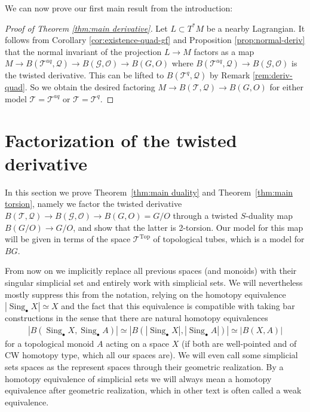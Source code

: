 \documentclass[reqno]{amsart}
\theoremstyle{theorem}
\theoremstyle{remark}
\theoremstyle{definition}
\newcommand{\T}{\mathcal{T}}
\newcommand{\GG}{\mathcal{G}}
\newcommand{\QQ}{\mathcal{Q}}
\newcommand{\OO}{\mathcal{O}}
\DeclareMathOperator{\sing}{Sing}
\newcommand{\TOP}{\mathrm{Top}}
\begin{document}
We can now prove our first main result from the introduction:
\begin{proof}[Proof of Theorem \ref{thm:main derivative}]
Let $L \subset T^*M$ be a nearby Lagrangian. It follows from Corollary \ref{cor:existence-quad-gf} and Proposition \ref{prop:normal-deriv} that the normal invariant of the projection $L \to M$ factors as a map $M \to B(\T^{aq} , \QQ) \to B(\GG, \OO) \to B(G,O)$ where $B(\T^{aq} , \QQ) \to B(\GG, \OO)$ is the twisted derivative. This can be lifted to $B(\T^q,\QQ)$ by Remark \ref{rem:deriv-quad}. So we obtain the desired factoring $M \to B(\T,\QQ) \to B(G,O)$ for either model $\T=\T^{aq}$ or $\T=\T^q$.
\end{proof}


















\section{Factorization of the twisted derivative}\label{sec:factorization}


In this section we prove Theorem~\ref{thm:main duality} and Theorem~\ref{thm:main torsion}, namely we
factor the twisted derivative $B(\T,\QQ)\to B(\GG,\OO)\to B(G,O)=G/O$
through a twisted $S$-duality map $B(G/O) \to G/O$, and show that the latter is 2-torsion.
Our model for this map will be given in terms of the space $\T^\TOP$ of topological tubes, which is a model for $BG$. 


From now on we implicitly replace all previous spaces (and monoids) with their singular simplicial set and entirely work with simplicial sets. We will nevertheless mostly suppress this from the notation, relying on the homotopy equivalence $|\sing_\bullet X| \simeq X$ and the fact that this equivalence is compatible with taking bar constructions in the sense that there are natural homotopy equivalences
\begin{align*}
  |B(\sing_\bullet X,\sing_\bullet A)| \simeq |B(|\sing_\bullet X|,|\sing_\bullet A|)| \simeq |B(X,A)|
\end{align*}
for a topological monoid $A$ acting on a space $X$ (if both are well-pointed and of CW homotopy type, which all our spaces are). We will even call some simplicial sets spaces as the represent spaces through their geometric realization. By a homotopy equivalence of simplicial sets we will always mean a homotopy equivalence after geometric realization, which in other text is often called a weak equivalence.
\end{document}
